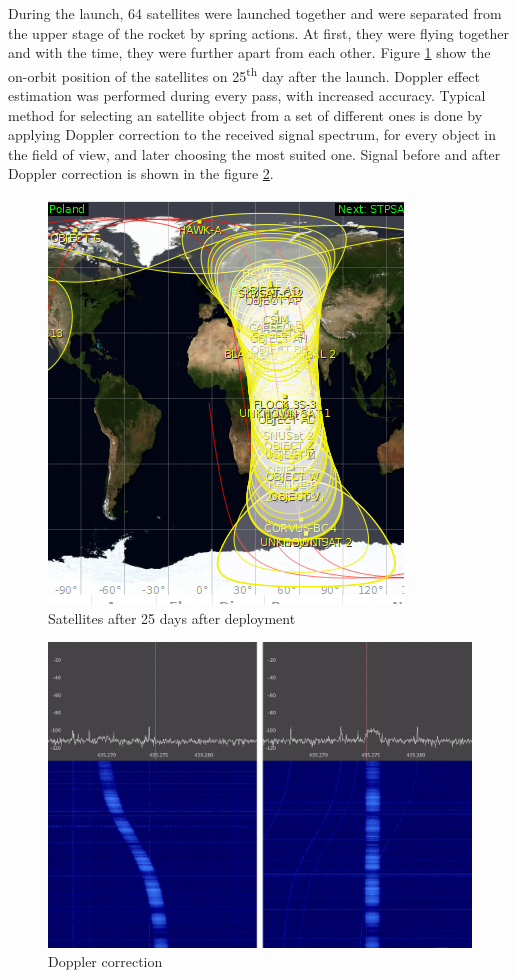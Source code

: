 During the launch, \si{64} satellites were launched together and were separated from the upper stage of the rocket by spring actions. At first, they were flying together and with the time, they were further apart from each other. Figure \ref{25_days} show the on-orbit position of the satellites on \si{25^{th}} day after the launch. Doppler effect estimation was performed during every pass, with increased accuracy. Typical method for selecting an satellite object from a set of different ones is done by applying Doppler correction to the received signal spectrum, for every object in the field of view, and later choosing the most suited one. Signal before and after Doppler correction is shown in the figure \ref{Doppler_correction_gqrx}.

\begin{figure}[H]
    \centering
    \includegraphics[width=0.4\paperwidth]{img/9/25_days.png}
    \caption{Satellites after \si{25} days after deployment}
    \label{25_days}
\end{figure}

\begin{figure}[H]
    \centering
    \includegraphics[width=0.5\paperwidth]{img/9/doppler_correction.png}
    \caption{Doppler correction}
    \label{Doppler_correction_gqrx}
\end{figure}

